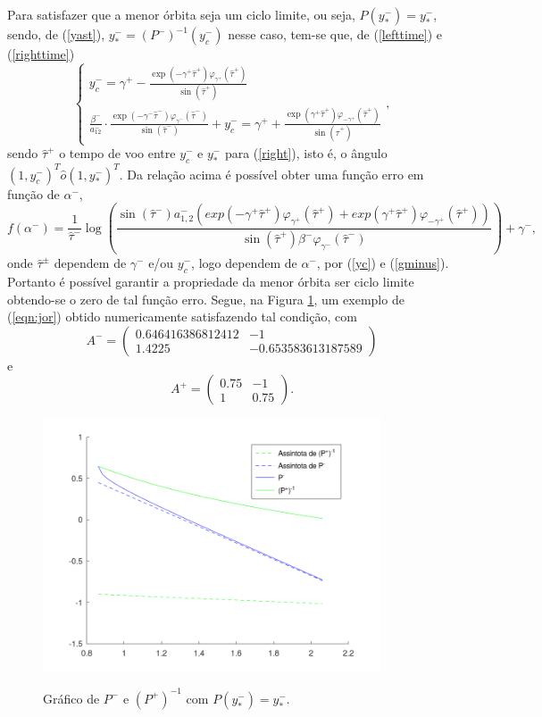 Para satisfazer que a menor órbita seja um ciclo limite, ou seja, $P(y^-_*)=y^-_*$, sendo, de (\ref{yast}), $y^-_*=(P^-)^{-1}(y^-_c)$ nesse caso, tem-se que, de (\ref{lefttime}) e (\ref{righttime})
$$
\left\{\begin{array}{l}
y_{c}^{-}=\gamma^{+}-\frac{\exp \left(-\gamma^{+} \hat{\tau}^{+}\right)  \varphi_{\gamma^{+}}\left(\hat{\tau}^{+}\right)}{\sin \left(\hat{\tau}^{+}\right)} \\
\frac{\beta^{-}}{a_{12}^{-}} \cdot \frac{\exp \left(-\gamma^{-} \hat{\tau}^{-}\right)  \varphi_{\gamma^{-}}\left(\hat{\tau}^{-}\right)}{\sin (\hat{\tau}^{-})}+y_{c}^{-}=\gamma^{+}+\frac{\exp \left(\gamma^{+} \hat{\tau}^{+}\right)  \varphi_{-\gamma^{+}}\left(\hat{\tau}^{+}\right)}{\sin \left(\hat{\tau}^{+}\right)}
\end{array}\right.,
$$
sendo $\hat{\tau}^{+}$ o tempo de voo entre $y_c^-$ e  $y^-_*$ para (\ref{right}), isto é, o ângulo $(1,y_c^-)^T\hat{o}(1,y^-_*)^T$. Da relação acima é possível obter uma função erro em função de $\alpha^-$,
\begin{equation}
\label{zero}
f\left( \alpha^-\right)=\frac{1}{\hat{\tau}^-} \log\left(\frac{\sin(\hat{\tau}^-)a^-_{1,2}\left(exp(-\gamma^+\hat{\tau}^+)\varphi_{\gamma^{+}}\left(\hat{\tau}^{+}\right)+exp(\gamma^+\hat{\tau}^+)\varphi_{-\gamma^{+}}\left(\hat{\tau}^{+}\right)\right)}{\sin(\hat{\tau}^+)\beta^-\varphi_{\gamma^{-}}\left(\hat{\tau}^{-}\right)}\right)+\gamma^-,
\end{equation}
onde $\hat{\tau}^\pm$ dependem de $\gamma^-$ e/ou $y_c^-$, logo dependem de $\alpha^-$, por (\ref{yc}) e (\ref{gminus}). Portanto é possível garantir a propriedade da menor órbita ser ciclo limite obtendo-se o zero de tal função erro. Segue, na Figura \ref{igua}, um exemplo de (\ref{eqn:jor}) obtido numericamente satisfazendo tal condição, com
\[
A^-=
\begin{pmatrix}
0.646416386812412& -1\\
1.4225& -0.653583613187589
\end{pmatrix}
\]
e
\[
A^+=
\begin{pmatrix}
0.75& -1\\
1& 0.75
\end{pmatrix}.
\]
\begin{figure}[H]
\centering
\includegraphics[width=10cm]{poinc}\\
\vspace{\baselineskip}
\caption{\label{igua}Gráfico de $P^-$ e $(P^+)^{-1}$ com $P(y^-_*)=y^-_*$.}
\end{figure}

